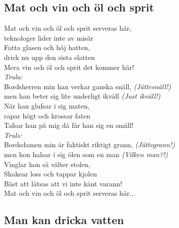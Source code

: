 \subsection*{Mat och vin och öl och sprit} 

\noindent Mat och vin och öl och sprit serveras här,\\
\noindent teknologer lider inte av misär\\
\noindent Fatta glasen och höj hatten,\\
\noindent drick nu upp den sista slatten\\
\noindent Mera vin och öl och sprit det kommer här!\\

\noindent \textit{Trula:}\\
\noindent Bordsherren min han verkar ganska snäll, \textit{(Jättesnäll!)}\\
\noindent men han beter sig lite underligt ikväll \textit{(Just ikväll!)}\\
\noindent När han glufsar i sig maten,\\
\noindent rapar högt och krossar faten\\
\noindent Tafsar han på mig då får han sig en smäll!\\

\noindent \textit{Truls:}\\
\noindent Bordsdamen min är faktiskt riktigt grann, \textit{(Jättegrann!)}\\
\noindent men hon halsar i sig ölen som en man \textit{(Vilken man?!)}\\
\noindent Vinglar hon så välter stolen,\\
\noindent Shakear loss och tappar kjolen\\
\noindent Bäst att låtsas att vi inte känt varann!\\

\noindent Mat och vin och öl och sprit serveras här...\\


\newpage

\subsection*{Man kan dricka vatten} 

